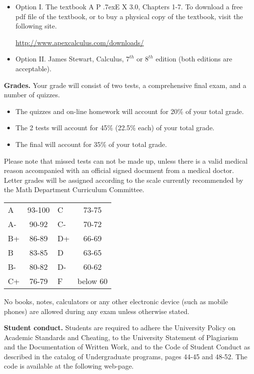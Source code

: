 \documentclass{article}
\newcommand{\apex}{A\kern -1pt \lower -2pt\hbox{P}\kern -4pt \lower .7ex\hbox{E}\kern -1pt X}
\begin{document}
\begin{itemize}
\item Option I. The textbook \apex{} 3.0, Chapters 1-7. To download a free pdf file of the textbook, or to buy a physical copy of the textbook, visit the following site.

\url{http://www.apexcalculus.com/downloads/} 
\item Option II. James Stewart, Calculus, $7^{th}$ or $8^{th}$ edition (both editions are acceptable).
\end{itemize}



\medskip
\noindent \textbf{Grades.} Your grade will consist of two tests, a comprehensive final exam, and a number of quizzes. 
\begin{itemize}
\item The quizzes and on-line homework will account for 20\% of your total grade.
\item The 2 tests will account for 45\% (22.5\% each) of your total grade.
\item The final will account for 35\% of your total grade.
\end{itemize}
Please note that missed tests can not be made up, unless there is a valid medical reason accompanied with an official signed document from a medical doctor. Letter grades will be assigned according to the scale currently recommended by the Math Department Curriculum Committee. 

\begin{center}
\begin{tabular}{lc|lc}
A & 93-100 & C  & 73-75 \\
A-& 90-92  & C- & 70-72 \\
B+& 86-89  & D+ & 66-69 \\
B & 83-85  & D  & 63-65\\
B-& 80-82  & D- & 60-62\\
C+& 76-79  & F  & below 60\\
\end{tabular}

\end{center}

No books, notes, calculators or any other electronic device (such as mobile phones) are allowed during any exam unless otherwise stated.

\medskip
\noindent \textbf{Student conduct.} Students  are required to adhere the University Policy on Academic Standards and Cheating, to the University Statement of Plagiarism and the Documentation of Written Work, and to the Code of Student Conduct as described in the catalog of Undergraduate programs, pages 44-45 and 48-52. The code is available at the following web-page.
\end{document}
